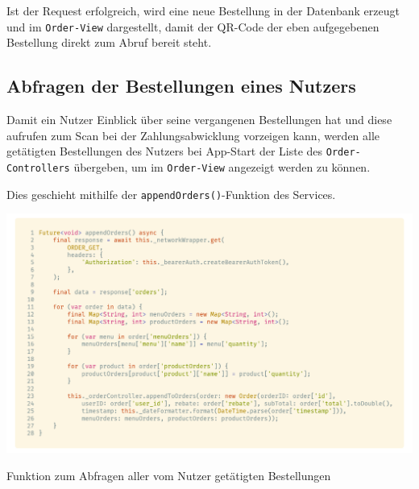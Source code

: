 Ist der Request erfolgreich, wird eine neue Bestellung in der Datenbank erzeugt und im 
\lstinline{Order-View} dargestellt, damit der QR-Code der eben aufgegebenen Bestellung
direkt zum Abruf bereit steht.

\subsection{Abfragen der Bestellungen eines Nutzers}

Damit ein Nutzer Einblick über seine vergangenen Bestellungen hat und diese aufrufen zum Scan 
bei der Zahlungsabwicklung vorzeigen kann, werden alle getätigten Bestellungen des Nutzers bei App-Start
der Liste des \lstinline{Order-Controllers} übergeben, um im \lstinline{Order-View} angezeigt werden zu können.

Dies geschieht mithilfe der \lstinline{appendOrders()}-Funktion des Services.

\begin{code}[H]
    \centering
    \includegraphics[width=1\textwidth]{images/Client/services/manage-orders/appendOrders.png}
    \vspace{-25pt}
    \caption{Funktion zum Abfragen aller vom Nutzer getätigten Bestellungen}
\end{code}